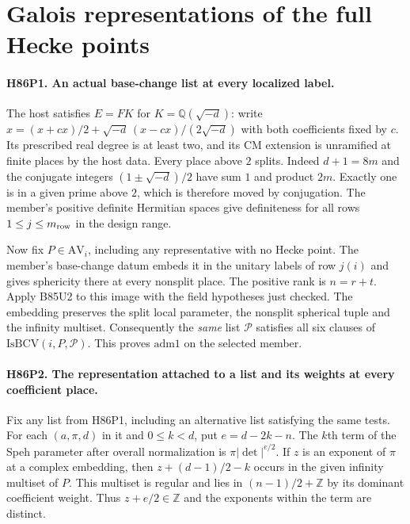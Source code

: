 \section{Galois representations of the full Hecke points}

\paragraph{H86P1. An actual base-change list at every localized label.}
The host satisfies $E=FK$ for $K=\mathbb Q(\sqrt{-d})$: write
$x=(x+cx)/2+\sqrt{-d}\,(x-cx)/(2\sqrt{-d})$ with both coefficients
fixed by $c$. Its prescribed real degree is at least two, and its CM
extension is unramified at finite places by the host data. Every
place above $2$ splits. Indeed $d+1=8m$ and the conjugate integers
$(1\pm\sqrt{-d})/2$ have sum $1$ and product $2m$.
Exactly one is in a given prime above $2$, which is therefore moved
by conjugation. The member's positive definite Hermitian spaces give
definiteness for all rows $1\le j\le m_{\rm row}$ in the design range.

Now fix $P\in\mathrm{AV}_i$, including any representative with
no Hecke point. The member's base-change datum embeds it in the
unitary labels of row $j(i)$ and gives sphericity there at every
nonsplit place. The positive rank is $n=r+t$. Apply B85U2 to this
image with the field hypotheses just checked. The embedding preserves
the split local parameter, the nonsplit spherical tuple and the
infinity multiset. Consequently the \emph{same} list $\mathcal P$
satisfies all six clauses of $\mathrm{IsBCV}(i,P,\mathcal P)$.
This proves $\mathrm{adm1}$ on the selected member.

\paragraph{H86P2. The representation attached to a list and its weights at every coefficient place.}
Fix any list from H86P1, including an alternative list satisfying
the same tests. For each $(a,\pi,d)$ in it and $0\le k<d$, put
$e=d-2k-n$. The $k$th term of the Speh parameter after overall
normalization is $\pi|\det|^{e/2}$. If $z$ is an exponent of
$\pi$ at a complex embedding, then $z+(d-1)/2-k$ occurs in the
given infinity multiset of $P$. This multiset is regular and lies
in $(n-1)/2+\mathbb Z$ by its dominant coefficient weight.
Thus $z+e/2\in\mathbb Z$ and the exponents within the term
are distinct.

